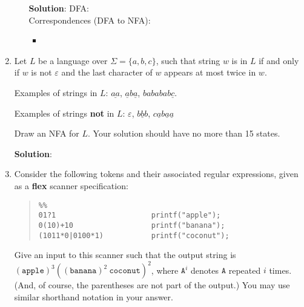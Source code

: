 \documentclass[11pt]{article}
\renewcommand{\epsilon}{\varepsilon}
\begin{document}
\begin{enumerate}
\begin{enumerate}

    \textbf{Solution}: DFA: \\

    Correspondences (DFA to NFA):
    \begin{itemize}
        \item %
    \end{itemize}
\end{enumerate}

\newpage

\item Let $L$ be a language over $\Sigma = \{a, b, c\}$, such that string $w$ is in $L$ if and only if $w$ is not $\epsilon$ and the last character of $w$ appears at most twice in $w$.

Examples of strings in $L$: $\underline{aa}$, $\underline{a}b\underline{a}$, $bababab\underline{c}$.

Examples of strings \textbf{not} in $L$: $\epsilon$, $\underline{bbb}$, $c\underline{a}b\underline{a}\underline{a}$

Draw an NFA for $L$.  Your solution should have no more than 15 states.

\textbf{Solution}:

\newpage

\item Consider the following tokens and their associated regular expressions, given as a \textbf{flex} scanner specification:
\begin{quote}
\begin{lstlisting}
%%
01?1                      printf("apple");
0(10)+10                  printf("banana");
(1011*0|0100*1)           printf("coconut");
\end{lstlisting}
\end{quote}
Give an input to this scanner such that the output string is $(\mathtt{apple})^3 ((\mathtt{banana})^2 \ \mathtt{coconut})^2$, where $\mathtt{A}^i$ denotes $\mathtt{A}$ repeated $i$ times.   (And, of course, the parentheses are not part of the output.)  You may use similar shorthand notation in your answer.


\end{enumerate}
\end{document}
